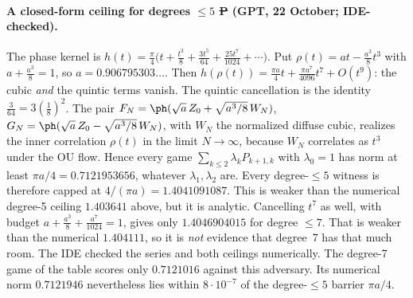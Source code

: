 \paragraph{A closed-form ceiling for degrees $\le5$ \st{P} (GPT, 22 October; IDE-checked).}
The phase kernel is $h(t)=\frac\pi4\bigl(t+\frac{t^3}8+\frac{3t^5}{64}+\frac{25t^7}{1024}+\cdots\bigr)$. Put $\rho(t)=at-\frac{a^3}8t^3$ with
$a+\frac{a^3}8=1$, so $a=0.906795303\ldots$. Then $h(\rho(t))=\frac{\pi a}4t+\frac{\pi a^7}{4096}t^7+O(t^9)$: the cubic \emph{and} the quintic terms vanish. The quintic
cancellation is the identity $\frac3{64}=3(\frac18)^2$. The pair $F_N=\ph(\sqrt a\,Z_0+\sqrt{a^3/8}\,W_N)$, $G_N=\ph(\sqrt a\,Z_0-\sqrt{a^3/8}\,W_N)$, with
$W_N$ the normalized diffuse cubic, realizes the inner correlation $\rho(t)$ in the limit $N\to\infty$, because $W_N$ correlates as $t^3$ under the OU flow.
Hence every game $\sum_{k\le2}\lambda_kP_{k+1,k}$ with $\lambda_0=1$ has norm at least $\pi a/4=0.7121953656$, whatever $\lambda_1,\lambda_2$ are. Every degree-$\le5$
witness is therefore capped at $4/(\pi a)=1.4041091087$. This is weaker than the numerical degree-5 ceiling $1.403641$ above, but it is analytic.
Cancelling $t^7$ as well, with budget $a+\frac{a^3}8+\frac{a^7}{1024}=1$, gives only $1.4046904015$ for degree $\le7$. That is weaker than the numerical $1.404111$, so it is
\emph{not} evidence that degree~7 has that much room. The IDE checked the series and both ceilings numerically. The degree-7 game of the table scores only $0.7121016$ against this
adversary. Its numerical norm $0.7121946$ nevertheless lies within $8\cdot10^{-7}$ of the degree-$\le5$ barrier $\pi a/4$.

